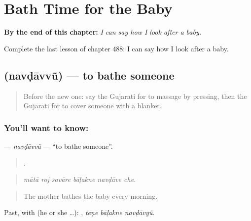 
\chapter{Bath Time for the Baby}
\label{ch:gu-bath-time-for-the-baby}

\begin{chapteropening}
\textbf{By the end of this chapter:} \emph{I can say how I look after a baby.}

Complete the last lesson of chapter 488: I can say how I look after a baby.
\end{chapteropening}

\section[\texorpdfstring{\gu{નવડાવવું} (navḍāvvũ)}{નવડાવવું (navḍāvvũ)}]{ (navḍāvvũ) — to bathe someone}

\label{lesson:GU-C488-navdavvu}



\begin{quote}
Before the new one: say the Gujarati for to massage by pressing, then the Gujarati for to cover someone with a blanket.
\end{quote}

\subsection*{You'll want to know: }
\textbf{} — \emph{navḍāvvũ} — \textquotedblleft{}to bathe someone\textquotedblright{}.

\begin{quote}
     .
\end{quote}

\begin{quote}
\emph{mātā roj savāre bāḷakne navḍāve che.}
\end{quote}

\begin{quote}
The mother bathes the baby every morning.
\end{quote}

Past, with  (he or she …):   , \emph{teṇe bāḷakne navḍāvyũ}.

